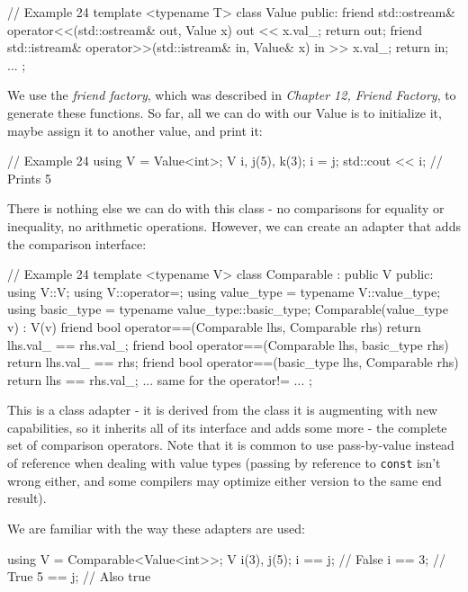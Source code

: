 \begin{code}
// Example 24
template <typename T> class Value {
  public:
  friend std::ostream& operator<<(std::ostream& out,
                                  Value x) {
    out << x.val_;
    return out;
  }
  friend std::istream& operator>>(std::istream& in,
                                  Value& x) {
    in >> x.val_;
    return in;
  }
  ...
};
\end{code}

We use the \emph{friend factory}, which was described in \emph{Chapter 12, Friend Factory}, to generate these functions. So far, all we can do with our Value is to initialize it, maybe assign it to another value, and print it:

\begin{code}
// Example 24
using V = Value<int>;
V i, j(5), k(3);
i = j;
std::cout << i;     // Prints 5
\end{code}

There is nothing else we can do with this class - no comparisons for equality or inequality, no arithmetic operations. However, we can create an adapter that adds the comparison interface:

\begin{code}
// Example 24
template <typename V> class Comparable : public V {
  public:
  using V::V;
  using V::operator=;
  using value_type = typename V::value_type;
  using basic_type = typename value_type::basic_type;
  Comparable(value_type v) : V(v) {}
  friend bool operator==(Comparable lhs, Comparable rhs) {
    return lhs.val_ == rhs.val_;
  }
  friend bool operator==(Comparable lhs, basic_type rhs) {
    return lhs.val_ == rhs;
  }
  friend bool operator==(basic_type lhs, Comparable rhs) {
    return lhs == rhs.val_;
  }
  ... same for the operator!= ...
};
\end{code}

This is a class adapter - it is derived from the class it is augmenting with new capabilities, so it inherits all of its interface and adds some more - the complete set of comparison operators. Note that it is common to use pass-by-value instead of reference when dealing with value types (passing by reference to \texttt{const} isn't wrong either, and some compilers may optimize either version to the same end result).

We are familiar with the way these adapters are used:

\begin{code}
using V = Comparable<Value<int>>;
V i(3), j(5);
i == j; // False
i == 3; // True
5 == j; // Also true
\end{code}

